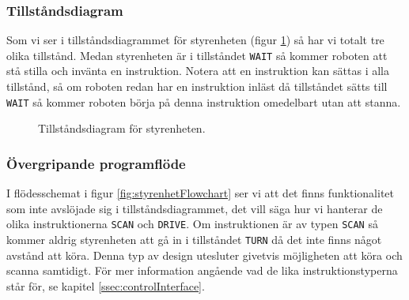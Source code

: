 \documentclass[a4paper,11pt]{article}
\begin{document}
\clearpage

\subsubsection{Tillståndsdiagram}
Som vi ser i tillståndsdiagrammet för styrenheten (figur \ref{fig:stateDiagram}) så har vi totalt tre olika tillstånd. Medan styrenheten är i tillståndet \texttt{WAIT} så kommer roboten att stå stilla och invänta en instruktion. Notera att en instruktion kan sättas i alla tillstånd, så om roboten redan har en instruktion inläst då tillståndet sätts till \texttt{WAIT} så kommer roboten börja på denna instruktion omedelbart utan att stanna.

\begin{figure}[h!]
	\caption{Tillståndsdiagram för styrenheten.}
	\label{fig:stateDiagram}
\end{figure}

\clearpage

\subsubsection{Övergripande programflöde}
I flödesschemat i figur \ref{fig:styrenhetFlowchart} ser vi att det finns funktionalitet som inte avslöjade sig i tillståndsdiagrammet, det vill säga hur vi hanterar de olika instruktionerna \texttt{SCAN} och \texttt{DRIVE}. Om instruktionen är av typen \texttt{SCAN} så kommer aldrig styrenheten att gå in i tillståndet \texttt{TURN} då det inte finns något avstånd att köra. Denna typ av design utesluter givetvis möjligheten att köra och scanna samtidigt. För mer information angående vad de lika instruktionstyperna står för, se kapitel \ref{ssec:controlInterface}. 
\end{document}
